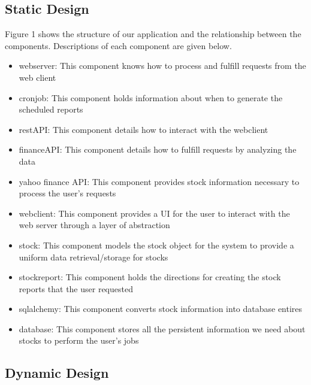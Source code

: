 \documentclass[12pt,a4paper]{article}
\begin{document}
\subsection{Static Design}
	
Figure 1 shows the structure of our application and the relationship between the components. Descriptions of each component are given below.
\begin{itemize}
\item webserver: This component knows how to process and fulfill requests from the web client 
\item cronjob: This component holds information about when to generate the scheduled reports
\item restAPI: This component details how to interact with the webclient
\item financeAPI: This component details how to fulfill requests by analyzing the data
\item yahoo finance API: This component provides stock information necessary to process the user's requests
\item webclient: This component provides a UI for the user to interact with the web server through a layer of abstraction
\item stock: This component models the stock object for the system to provide a uniform data retrieval/storage for stocks
\item stockreport: This component holds the directions for creating the stock reports that the user requested
\item sqlalchemy: This component converts stock information into database entires
\item database: This component stores all the persistent information we need about stocks to perform the user's jobs
\end{itemize}

\subsection{Dynamic Design}
\end{document}
